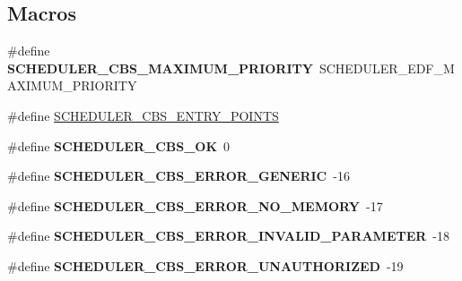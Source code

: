 \subsection*{Macros}
\begin{DoxyCompactItemize}
\item 
\mbox{\label{group__RTEMSScoreSchedulerCBS_ga06715df28599f11df4689063b6673e41}} 
\#define {\bfseries S\+C\+H\+E\+D\+U\+L\+E\+R\+\_\+\+C\+B\+S\+\_\+\+M\+A\+X\+I\+M\+U\+M\+\_\+\+P\+R\+I\+O\+R\+I\+TY}~S\+C\+H\+E\+D\+U\+L\+E\+R\+\_\+\+E\+D\+F\+\_\+\+M\+A\+X\+I\+M\+U\+M\+\_\+\+P\+R\+I\+O\+R\+I\+TY
\item 
\#define \mbox{\hyperlink{group__RTEMSScoreSchedulerCBS_gacc7efa225c425f676bafa3e5af3c6117}{S\+C\+H\+E\+D\+U\+L\+E\+R\+\_\+\+C\+B\+S\+\_\+\+E\+N\+T\+R\+Y\+\_\+\+P\+O\+I\+N\+TS}}
\item 
\mbox{\label{group__RTEMSScoreSchedulerCBS_ga7dba3699ae2b293b937826c7b75e3f1d}} 
\#define {\bfseries S\+C\+H\+E\+D\+U\+L\+E\+R\+\_\+\+C\+B\+S\+\_\+\+OK}~0
\item 
\mbox{\label{group__RTEMSScoreSchedulerCBS_ga1879cc34d66a149be3abea029d34fda7}} 
\#define {\bfseries S\+C\+H\+E\+D\+U\+L\+E\+R\+\_\+\+C\+B\+S\+\_\+\+E\+R\+R\+O\+R\+\_\+\+G\+E\+N\+E\+R\+IC}~-\/16
\item 
\mbox{\label{group__RTEMSScoreSchedulerCBS_ga95eee745932451f33fe66968c1c9369c}} 
\#define {\bfseries S\+C\+H\+E\+D\+U\+L\+E\+R\+\_\+\+C\+B\+S\+\_\+\+E\+R\+R\+O\+R\+\_\+\+N\+O\+\_\+\+M\+E\+M\+O\+RY}~-\/17
\item 
\mbox{\label{group__RTEMSScoreSchedulerCBS_ga7775052b140cd6f668e1748a79673454}} 
\#define {\bfseries S\+C\+H\+E\+D\+U\+L\+E\+R\+\_\+\+C\+B\+S\+\_\+\+E\+R\+R\+O\+R\+\_\+\+I\+N\+V\+A\+L\+I\+D\+\_\+\+P\+A\+R\+A\+M\+E\+T\+ER}~-\/18
\item 
\mbox{\label{group__RTEMSScoreSchedulerCBS_ga5929eface80d9ad7b13ac75c4c3a560d}} 
\#define {\bfseries S\+C\+H\+E\+D\+U\+L\+E\+R\+\_\+\+C\+B\+S\+\_\+\+E\+R\+R\+O\+R\+\_\+\+U\+N\+A\+U\+T\+H\+O\+R\+I\+Z\+ED}~-\/19
\item 
\mbox{\label{group__RTEMSScoreSchedulerCBS_ga446c08ba2f7295ffc37116094318844d}} 

\end{DoxyCompactItemize}
